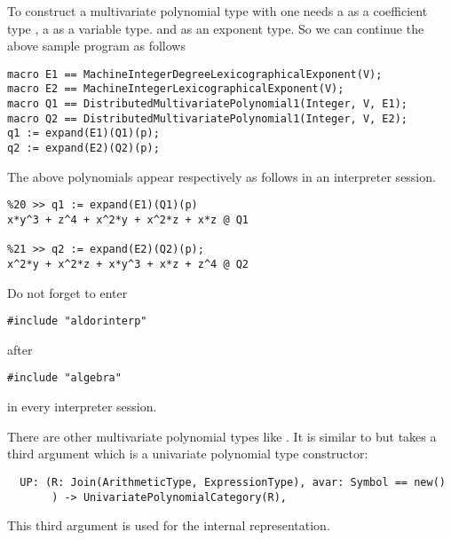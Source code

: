 To construct a multivariate polynomial type with 
one needs a  as  a coefficient type ,
a  as a variable type.
and  as an exponent type.
So we can continue the above sample program as follows
\begin{verbatim}
macro E1 == MachineIntegerDegreeLexicographicalExponent(V);
macro E2 == MachineIntegerLexicographicalExponent(V);
macro Q1 == DistributedMultivariatePolynomial1(Integer, V, E1);
macro Q2 == DistributedMultivariatePolynomial1(Integer, V, E2);
q1 := expand(E1)(Q1)(p);
q2 := expand(E2)(Q2)(p);
\end{verbatim}

The above polynomials appear respectively as follows
in an interpreter session.
\begin{verbatim}
%20 >> q1 := expand(E1)(Q1)(p)
x*y^3 + z^4 + x^2*y + x^2*z + x*z @ Q1

%21 >> q2 := expand(E2)(Q2)(p);
x^2*y + x^2*z + x*y^3 + x*z + z^4 @ Q2
\end{verbatim}
Do not forget to enter
\begin{verbatim}
#include "aldorinterp"
\end{verbatim}
after 
\begin{verbatim}
#include "algebra"
\end{verbatim}
in every interpreter session.

There are other multivariate polynomial types 
like .
It is similar to 
but takes a third argument which is a univariate polynomial
type constructor:
\begin{verbatim}
  UP: (R: Join(ArithmeticType, ExpressionType), avar: Symbol == new()
       ) -> UnivariatePolynomialCategory(R),
\end{verbatim}
This third argument is used for the internal representation.

